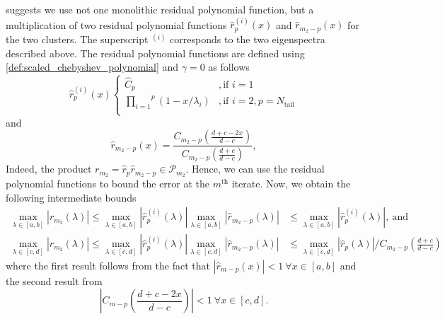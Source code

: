 \citeauthor{cg_sharpened_convrate_Axelsson1976} suggests we use not one monolithic residual polynomial function, but a multiplication of two residual polynomial functions $\hat{r}^{(i)}_p(x)$ and $\hat{r}_{m_2-p}(x)$ for the two clusters. The superscript $^{(i)}$ corresponds to the two eigenspectra described above. The residual polynomial functions are defined using \cref{def:scaled_chebyshev_polynomial} and $\gamma = 0$ as follows
\begin{equation}
    \hat{r}^{(i)}_p (x)
    \begin{cases}
        \hat{C}_p&, \text{if } i = 1\\
        \overset{p}{\underset{i=1}{\prod}} (1 - x/\lambda_i)&, \text{if } i = 2, p = N_{\text{tail}}\\
    \end{cases}
    \label{eq:residual_polynomial_rm}
\end{equation}
and
\begin{equation}
    \hat{r}_{{m_2}-p} (x) = \frac{C_{m_2-p} \left(\frac{d + c - 2x}{d - c}\right)}{C_{m_2-p}\left(\frac{d + c}{d - c}\right)},
    \label{eq:residual_polynomial_rpm}
\end{equation}
Indeed, the product $r_{m_2} = \hat{r}_p \hat{r}_{m_2-p} \in \mathcal{P}_{m_2}$. Hence, we can use the residual polynomial functions to bound the error at the $m^{\text{th}}$ iterate. Now, we obtain the following intermediate bounds
\begin{subequations}
    \begin{align}
        \max_{\lambda \in [a,b]} |r_{m_2}(\lambda)| \leq \max_{\lambda \in [a,b]} |\hat{r}^{(i)}_p(\lambda)| \max_{\lambda \in [a,b]} |\hat{r}_{m_2-p}(\lambda)| &\leq \max_{\lambda \in [a,b]} |\hat{r}^{(i)}_p(\lambda)|, \ \text{and} \label{eq:residual_polynomial_bound_ab}\\
        \max_{\lambda \in [c,d]} |r_{m_2}(\lambda)| \leq \max_{\lambda \in [c,d]} |\hat{r}^{(i)}_p(\lambda)| \max_{\lambda \in [c,d]} |\hat{r}_{m_2-p}(\lambda)| &\leq \max_{\lambda \in [c,d]} |\hat{r}_{p}(\lambda)|/C_{m_2-p}\left(\frac{d+c}{d-c}\right) \label{eq:residual_polynomial_bound_cd}
    \end{align}
\end{subequations}
where the first result follows from the fact that $|\hat{r}_{m-p}(x)| < 1 \ \forall x \in [a,b]$ and the second result from 
\[
    \left|C_{m-p}\left(\frac{d+c -2x}{d-c}\right)\right| < 1 \ \forall x \in [c,d].
\]

